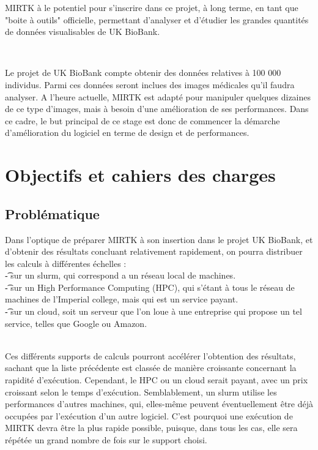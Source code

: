 \documentclass[10pt]{report}
\begin{document}
	 MIRTK à le potentiel pour s'inscrire dans ce projet, à long terme, en tant que "boite à outils" officielle, permettant d'analyser et d'étudier les grandes quantités de données visualisables de UK BioBank. ~\par~\par
	 Le projet de UK BioBank compte obtenir des données relatives à 100 000 individus. Parmi ces données seront inclues des images médicales qu'il faudra analyser. A l'heure actuelle, MIRTK est adapté pour manipuler quelques dizaines de ce type d'images, mais à besoin d'une amélioration de ses performances. Dans ce cadre, le but principal de ce stage est donc de commencer la démarche d'amélioration du logiciel en terme de design et de performances.
	 
\chapter{Objectifs et cahiers des charges}

	\section{Problématique} 
	Dans l'optique de préparer MIRTK à son insertion dans le projet UK BioBank, et d'obtenir des résultats concluant relativement rapidement, on pourra distribuer les calculs à différentes échelles : \\
	\t - sur un slurm, qui correspond a un réseau local de machines.\\
	\t - sur un High Performance Computing (HPC), qui s'étant à tous le réseau de machines de l'Imperial college, mais qui est un service payant.\\
	\t - sur un cloud, soit un serveur que l'on loue à une entreprise qui propose un tel service, telles que Google ou Amazon.\\ ~\par
	Ces différents supports de calculs pourront accélérer l'obtention des résultats, sachant que la liste précédente est classée de manière croissante concernant la rapidité d'exécution. Cependant, le HPC ou un cloud serait payant, avec un prix croissant selon le temps d'exécution. Semblablement, un slurm utilise les performances d'autres machines, qui, elles-même peuvent éventuellement être déjà occupées par l'exécution d'un autre logiciel. C'est pourquoi une exécution de MIRTK devra être la plus rapide possible, puisque, dans tous les cas, elle sera répétée un grand nombre de fois sur le support choisi.
	\vspace{-0.5cm}
	
\end{document}
